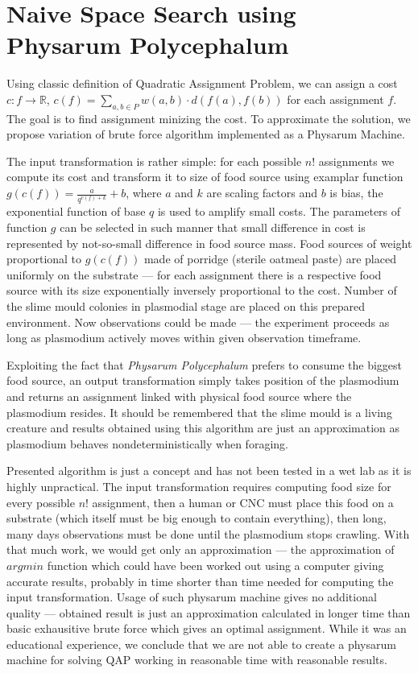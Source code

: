 \section{Naive Space Search using Physarum Polycephalum}
\label{section:algorithm_naive}

Using classic definition of Quadratic Assignment Problem, we can assign a cost $c : f \rightarrow \mathbb{R}$, $c(f) = \sum_{a,b\in P}w(a,b)\cdot d(f(a), f(b))$ for each assignment $f$. The goal is to find assignment minizing the cost. To approximate the solution, we propose variation of brute force algorithm implemented as a Physarum Machine.

The input transformation is rather simple: for each possible $n!$ assignments we compute its cost and transform it to size of food source using examplar function $g(c(f)) = \frac{a}{q^{c(f)+k}}+b$, where $a$ and $k$ are scaling factors and $b$ is bias, the exponential function of base $q$ is used to amplify small costs. The parameters of function $g$ can be selected in such manner that small difference in cost is represented by not-so-small difference in food source mass. Food sources of weight proportional to $g(c(f))$ made of porridge (sterile oatmeal paste) are placed uniformly on the substrate --- for each assignment there is a respective food source with its size exponentially inversely proportional to the cost. Number of the slime mould colonies in plasmodial stage are placed on this prepared environment. Now observations could be made --- the experiment proceeds as long as plasmodium actively moves within given observation timeframe. 

Exploiting the fact that \textit{Physarum Polycephalum} prefers to consume the biggest food source, an output transformation simply takes position of the plasmodium and returns an assignment linked with physical food source where the plasmodium resides. It should be remembered that the slime mould is a living creature and results obtained using this algorithm are just an approximation as plasmodium behaves nondeterministically when foraging.

Presented algorithm is just a concept and has not been tested in a wet lab as it is highly unpractical. The input transformation requires computing food size for every possible $n!$ assignment, then a human or CNC must place this food on a substrate (which itself must be big enough to contain everything), then long, many days observations must be done until the plasmodium stops crawling. With that much work, we would get only an approximation --- the approximation of $argmin$ function which could have been worked out using a computer giving accurate results, probably in time shorter than time needed for computing the input transformation. Usage of such physarum machine gives no additional quality --- obtained result is just an approximation calculated in longer time than basic exhausitive brute force which gives an optimal assignment. While it was an educational experience, we conclude that we are not able to create a physarum machine for solving QAP working in reasonable time with reasonable results.
